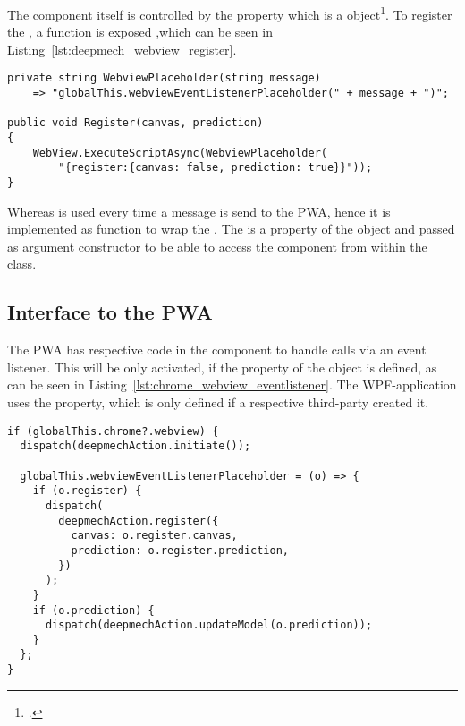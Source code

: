 The  component itself is controlled by the  property which is a  object\footnote{.}.
To register the , a  function is exposed ,which can be seen in Listing~\ref{lst:deepmech_webview_register}.

\begin{lstlisting}[label={lst:deepmech_webview_register}, caption={DeepmechWebView Register function}]
private string WebviewPlaceholder(string message)
    => "globalThis.webviewEventListenerPlaceholder(" + message + ")";

public void Register(canvas, prediction)
{
    WebView.ExecuteScriptAsync(WebviewPlaceholder(
        "{register:{canvas: false, prediction: true}}"));
}
\end{lstlisting}

Whereas  is used every time a message is send to the PWA, hence it is implemented as function to wrap the .
The  is a property of the  object and passed as argument constructor to be able to access the  component from within the class.

\subsection{Interface to the PWA} \label{ch:interface_to_the_pwa}

The PWA has respective code in the  component to handle calls via an event listener.
This will be only activated, if the  property of the  object is defined, as can be seen in Listing~\ref{lst:chrome_webview_eventlistener}.
The WPF-application uses the  property, which is only defined if a respective third-party created it.

\begin{lstlisting}[label={lst:chrome_webview_eventlistener}, caption={PWA event-handler for the chrome webview}]
if (globalThis.chrome?.webview) {
  dispatch(deepmechAction.initiate());

  globalThis.webviewEventListenerPlaceholder = (o) => {
    if (o.register) {
      dispatch(
        deepmechAction.register({
          canvas: o.register.canvas,
          prediction: o.register.prediction,
        })
      );
    }
    if (o.prediction) {
      dispatch(deepmechAction.updateModel(o.prediction));
    }
  };
}
\end{lstlisting}

